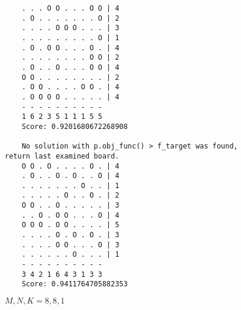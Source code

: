 \begin{figure}[h!]
    \begin{verbatim}
    . . . O O . . . O O | 4
    . O . . . . . . . O | 2
    . . . . O O O . . . | 3
    . . . . . . . . . O | 1
    . O . O O . . . O . | 4
    . . . . . . . . O O | 2
    . O . . O . . . O O | 4
    O O . . . . . . . . | 2
    . O O . . . . O O . | 4
    . O O O O . . . . . | 4
    - - - - - - - - - -
    1 6 2 3 5 1 1 1 5 5
    Score: 0.9201680672268908

    No solution with p.obj_func() > f_target was found, return last examined board.
    O O . O . . . . O . | 4
    . O . . O . O . . O | 4
    . . . . . . . O . . | 1
    . . . . . O . . O . | 2
    O O . . O . . . . . | 3
    . . O . O O . . . O | 4
    O O O . O O . . . . | 5
    . . . . O . O . O . | 3
    . . . . O O . . . O | 3
    . . . . . . O . . . | 1
    - - - - - - - - - -
    3 4 2 1 6 4 3 1 3 3
    Score: 0.9411764705882353
    \end{verbatim}
\caption{$M, N, K = 8, 8, 1$}
\end{figure}
